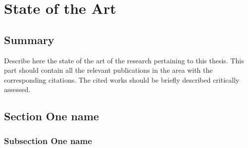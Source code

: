 
\chapter{State of the Art}
\label{chap:first}
\ifpdf
    \graphicspath{{Chapter1/Figures/PNG/}{Chapter1/Figures/PDF/}{Chapter1/Figures/}}
\else
    \graphicspath{{Chapter1/Figures/EPS/}{Chapter1/Figures/}}
\fi


\section*{Summary}

Describe here the state of the art of the research pertaining to this thesis. This part should contain all the relevant publications in the area with the corresponding citations. The cited works should be briefly described critically assessed.
%


\section{Section One name}
\label{sec:sec21}

\subsection{Subsection One name}
\label{sec:subsec21}
